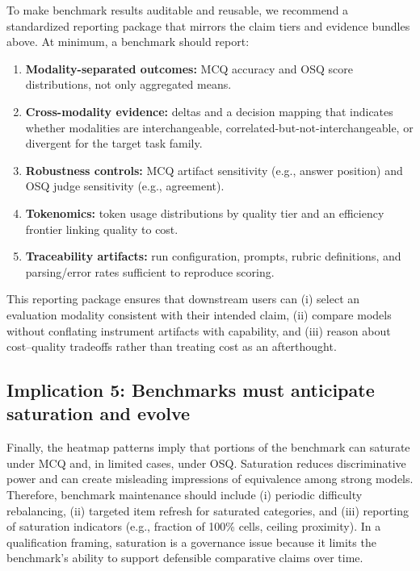 To make benchmark results auditable and reusable, we recommend a standardized reporting package that mirrors the claim tiers and evidence bundles above. At minimum, a benchmark should report:
\begin{enumerate}
    \item \textbf{Modality-separated outcomes:} MCQ accuracy and OSQ score distributions, not only aggregated means.
    \item \textbf{Cross-modality evidence:} deltas and a decision mapping that indicates whether modalities are interchangeable, correlated-but-not-interchangeable, or divergent for the target task family.
    \item \textbf{Robustness controls:} MCQ artifact sensitivity (e.g., answer position) and OSQ judge sensitivity (e.g., agreement).
    \item \textbf{Tokenomics:} token usage distributions by quality tier and an efficiency frontier linking quality to cost.
    \item \textbf{Traceability artifacts:} run configuration, prompts, rubric definitions, and parsing/error rates sufficient to reproduce scoring.
\end{enumerate}

This reporting package ensures that downstream users can (i) select an evaluation modality consistent with their intended claim, (ii) compare models without conflating instrument artifacts with capability, and (iii) reason about cost--quality tradeoffs rather than treating cost as an afterthought.

\subsection{Implication 5: Benchmarks must anticipate saturation and evolve}
\label{subsec:ch5_imp_saturation}

Finally, the heatmap patterns imply that portions of the benchmark can saturate under MCQ and, in limited cases, under OSQ. Saturation reduces discriminative power and can create misleading impressions of equivalence among strong models. Therefore, benchmark maintenance should include (i) periodic difficulty rebalancing, (ii) targeted item refresh for saturated categories, and (iii) reporting of saturation indicators (e.g., fraction of 100\% cells, ceiling proximity). In a qualification framing, saturation is a governance issue because it limits the benchmark's ability to support defensible comparative claims over time.

